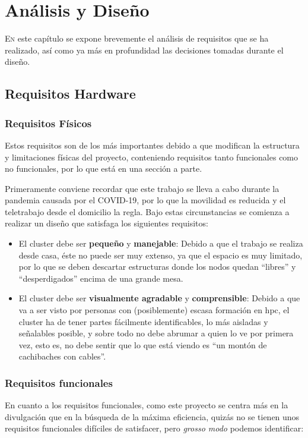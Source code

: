 \chapter{Análisis y Diseño}
\label{chap:analisis_diseño}

\lettrine{E}{n} este capítulo se expone brevemente el análisis de requisitos que se ha realizado, así como ya más en profundidad las decisiones tomadas durante el diseño.

\section{Requisitos Hardware}
\label{sec:requisitos_hardware}
\subsection{Requisitos Físicos}
Estos requisitos son de los más importantes debido a que modifican la estructura y limitaciones físicas del proyecto, conteniendo requisitos tanto funcionales como no funcionales, por lo que está en una sección a parte.

Primeramente conviene recordar que este trabajo se lleva a cabo durante la pandemia causada por el COVID-19, por lo que la movilidad es reducida y el teletrabajo desde el domicilio la regla. Bajo estas circunstancias se comienza a realizar un diseño que satisfaga los siguientes requisitos:
\begin{itemize}
    \item El cluster debe ser \textbf{pequeño} y \textbf{manejable}: Debido a que el trabajo se realiza desde casa, éste no puede ser muy extenso, ya que el espacio es muy limitado, por lo que se deben descartar estructuras donde los nodos quedan ``libres'' y ``desperdigados'' encima de una grande mesa.
    \item El cluster debe ser \textbf{visualmente agradable} y \textbf{comprensible}: Debido a que va a ser visto por personas con (posiblemente) escasa formación en \acrshort{hpc}, el cluster ha de tener partes fácilmente identificables, lo más aisladas y señalables posible, y sobre todo no debe abrumar a quien lo ve por primera vez, esto es, no debe sentir que lo que está viendo es ``un montón de cachibaches con cables''.
\end{itemize}

\subsection{Requisitos funcionales}
En cuanto a los requisitos funcionales, como este proyecto se centra más en la divulgación que en la búsqueda de la máxima eficiencia, quizás no se tienen unos requisitos funcionales difíciles de satisfacer, pero \textit{grosso modo} podemos identificar:

